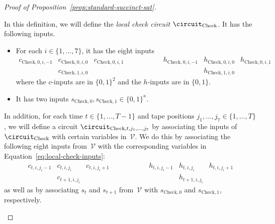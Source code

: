 \begin{proof}[Proof of Proposition~\ref{prop:standard-succinct-sat}]
  \begin{definition}\label{def:local-check-circuit}
    In this definition, we will define the \emph{local check circuit}
    $\circuit_{\mathrm{Check}}$.
    It has the following inputs.
    \begin{itemize}
    \item For each $i \in \{1, \ldots, 7\}$, it has the eight inputs
      \begin{equation}
        \label{eq:local-check-inputs}
        \begin{matrix}
          c_{\mathrm{Check}, 0, i, -1} & c_{\mathrm{Check}, 0, i, 0} &
          c_{\mathrm{Check}, 0, i, 1} & \qquad\qquad &
          h_{\mathrm{Check}, 0, i, -1} & h_{\mathrm{Check}, 0, i, 0} &
          h_{\mathrm{Check}, 0, i, 1} \\
          & c_{\mathrm{Check}, 1, i, 0} & & & &
          h_{\mathrm{Check}, 1, i, 0} &
        \end{matrix}
      \end{equation}
      where the $c$-inputs are in $\{0, 1\}^2$ and the $h$-inputs are in $\{0,
      1\}$.
    \item It has two inputs $s_{\mathrm{Check}, 0}, s_{\mathrm{Check}, 1} \in
      \{0, 1\}^\kappa$.
    \end{itemize}
    In addition, for each time $t \in \{1, \ldots, T-1\}$ and tape positions
    $j_1, \ldots, j_7 \in \{1, \ldots, T\}$, we will define a circuit
    $\circuit_{\mathrm{Check}, t, j_1, \ldots, j_7}$ by associating the inputs
    of $\circuit_{\mathrm{Check}}$ with certain variables in~$\mathcal{V}$.
    We do this by associating the following eight inputs from~$\mathcal{V}$ with
    the corresponding variables in Equation~\eqref{eq:local-check-inputs}:
    \begin{equation*}
      \begin{matrix}
        c_{t, i, j_i-1} & c_{t, i, j_i} & c_{t, i, j_i+1} & \qquad\qquad &
        h_{t, i, j_i-1} & h_{t, i, j_i} & h_{t, i, j_i+1} \\
        & c_{t+1, i, j_i} & & & & h_{t+1, i, j_i} &
      \end{matrix}
    \end{equation*}
    as well as by associating $s_t$ and $s_{t+1}$ from~$\mathcal{V}$ with
    $s_{\mathrm{Check}, 0}$ and $s_{\mathrm{Check},1}$, respectively.


\end{definition}
\end{proof}
